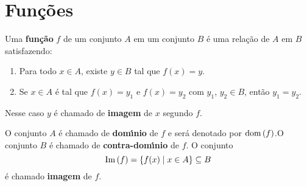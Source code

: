 \chapter{Fun{\c c}{\~o}es}

\begin{definicao}
Uma \textbf{fun{\c c}{\~a}o} $f$ de um conjunto $A$ em um conjunto $B$ {\'e} uma rela{\c c}{\~a}o de $A$ em $B$ satisfazendo:
	\begin{enumerate}
		\item Para todo $x \in A$, existe $y \in B$ tal que $f(x) = y$.
		\item  Se $x \in A$ é tal que $f(x) = y_{1}$ e $f(x) = y_{2}$ com $y_1$, $y_2 \in B$, então $y_{1} = y_{2}$.
	\end{enumerate}
Nesse caso $y$ é chamado de \textbf{imagem} de $x$ segundo $f$.
\end{definicao}

O conjunto $A$ {\'e} chamado de \textbf{dom{\'\i}nio} de $f$ e será denotado por ${\rm dom\,}(f)$.O conjunto $B$ {\'e} chamado de \textbf{contra-dom{\'\i}nio} de $f$. O conjunto
\[
	{\rm Im\,}(f) = \{f(x) \mid x \in A\} \subseteq B
\]
é chamado \textbf{imagem} de $f$.


